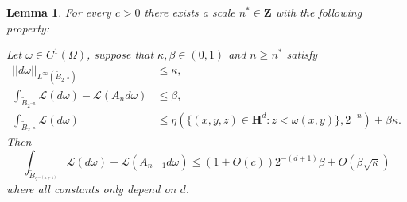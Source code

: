 \documentclass[reqno,12pt,letterpaper]{amsart}
\newcommand{\ZZ}{\mathbf{Z}}
\newcommand{\Hyp}{\mathbf H}
\newcommand{\Lagrange}{\mathscr L}
\newtheorem{lemma}[theorem]{Lemma}
\theoremstyle{definition}
\numberwithin{equation}{section}
\begin{document}
\begin{lemma}\label{DGL1}
For every $c > 0$ there exists a scale $n^* \in \ZZ$ with the following property:

Let $\omega \in C^1(\Omega)$, suppose that $\kappa, \beta \in (0, 1)$ and $n \geq n^*$ satisfy
\begin{align}
||d\omega||_{L^\infty(\tilde B_{2^{-n}})} &\leq \kappa, \label{DGL1 1}\\
\int_{\tilde B_{2^{-n}}} \Lagrange(d\omega) - \Lagrange(A_n d\omega) &\leq \beta, \label{DGL1 2}\\
\int_{\tilde B_{2^{-n}}} \Lagrange(d\omega) &\leq \eta(\{(x, y, z) \in \Hyp^d: z < \omega(x, y)\}, 2^{-n}) + \beta \kappa. \label{DGL1 3}
\end{align}
Then
$$\int_{\tilde B_{2^{-(n + 1)}}}\Lagrange(d\omega) - \Lagrange(A_{n + 1} d\omega) \leq (1 + O(c)) 2^{-(d + 1)} \beta + O(\beta \sqrt \kappa)$$
where all constants only depend on $d$.
\end{lemma}
\end{document}
